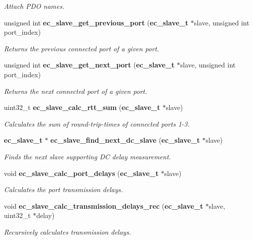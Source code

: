 \begin{DoxyCompactItemize}
\begin{DoxyCompactList}\small\item\em Attach P\-D\-O names. \end{DoxyCompactList}\item 
unsigned int {\bf ec\-\_\-slave\-\_\-get\-\_\-previous\-\_\-port} ({\bf ec\-\_\-slave\-\_\-t} $\ast$slave, unsigned int port\-\_\-index)
\begin{DoxyCompactList}\small\item\em Returns the previous connected port of a given port. \end{DoxyCompactList}\item 
unsigned int {\bf ec\-\_\-slave\-\_\-get\-\_\-next\-\_\-port} ({\bf ec\-\_\-slave\-\_\-t} $\ast$slave, unsigned int port\-\_\-index)
\begin{DoxyCompactList}\small\item\em Returns the next connected port of a given port. \end{DoxyCompactList}\item 
uint32\-\_\-t {\bf ec\-\_\-slave\-\_\-calc\-\_\-rtt\-\_\-sum} ({\bf ec\-\_\-slave\-\_\-t} $\ast$slave)
\begin{DoxyCompactList}\small\item\em Calculates the sum of round-\/trip-\/times of connected ports 1-\/3. \end{DoxyCompactList}\item 
{\bf ec\-\_\-slave\-\_\-t} $\ast$ {\bf ec\-\_\-slave\-\_\-find\-\_\-next\-\_\-dc\-\_\-slave} ({\bf ec\-\_\-slave\-\_\-t} $\ast$slave)
\begin{DoxyCompactList}\small\item\em Finds the next slave supporting D\-C delay measurement. \end{DoxyCompactList}\item 
void {\bf ec\-\_\-slave\-\_\-calc\-\_\-port\-\_\-delays} ({\bf ec\-\_\-slave\-\_\-t} $\ast$slave)
\begin{DoxyCompactList}\small\item\em Calculates the port transmission delays. \end{DoxyCompactList}\item 
void {\bf ec\-\_\-slave\-\_\-calc\-\_\-transmission\-\_\-delays\-\_\-rec} ({\bf ec\-\_\-slave\-\_\-t} $\ast$slave, uint32\-\_\-t $\ast$delay)
\begin{DoxyCompactList}\small\item\em Recursively calculates transmission delays. \end{DoxyCompactList}\end{DoxyCompactItemize}
